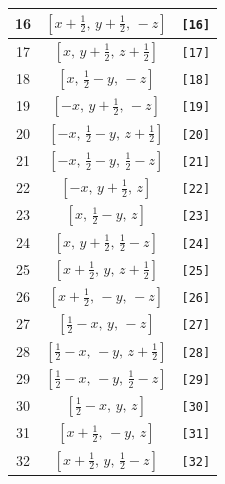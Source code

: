 \documentclass[fleqn,8pt]{jsarticle}
\begin{document}
\begin{longtable}{ccc}
16 & $\left[ x + \frac{1}{2},\, y + \frac{1}{2},\, - z \right]$ & {\tt [16]} \\ \hline
17 & $\left[ x,\, y + \frac{1}{2},\, z + \frac{1}{2} \right]$ & {\tt [17]} \\ \hline
18 & $\left[ x,\, \frac{1}{2} - y,\, - z \right]$ & {\tt [18]} \\ \hline
19 & $\left[ - x,\, y + \frac{1}{2},\, - z \right]$ & {\tt [19]} \\ \hline
20 & $\left[ - x,\, \frac{1}{2} - y,\, z + \frac{1}{2} \right]$ & {\tt [20]} \\ \hline
21 & $\left[ - x,\, \frac{1}{2} - y,\, \frac{1}{2} - z \right]$ & {\tt [21]} \\ \hline
22 & $\left[ - x,\, y + \frac{1}{2},\, z \right]$ & {\tt [22]} \\ \hline
23 & $\left[ x,\, \frac{1}{2} - y,\, z \right]$ & {\tt [23]} \\ \hline
24 & $\left[ x,\, y + \frac{1}{2},\, \frac{1}{2} - z \right]$ & {\tt [24]} \\ \hline
25 & $\left[ x + \frac{1}{2},\, y,\, z + \frac{1}{2} \right]$ & {\tt [25]} \\ \hline
26 & $\left[ x + \frac{1}{2},\, - y,\, - z \right]$ & {\tt [26]} \\ \hline
27 & $\left[ \frac{1}{2} - x,\, y,\, - z \right]$ & {\tt [27]} \\ \hline
28 & $\left[ \frac{1}{2} - x,\, - y,\, z + \frac{1}{2} \right]$ & {\tt [28]} \\ \hline
29 & $\left[ \frac{1}{2} - x,\, - y,\, \frac{1}{2} - z \right]$ & {\tt [29]} \\ \hline
30 & $\left[ \frac{1}{2} - x,\, y,\, z \right]$ & {\tt [30]} \\ \hline
31 & $\left[ x + \frac{1}{2},\, - y,\, z \right]$ & {\tt [31]} \\ \hline
32 & $\left[ x + \frac{1}{2},\, y,\, \frac{1}{2} - z \right]$ & {\tt [32]} \\
\end{longtable}
\end{document}
